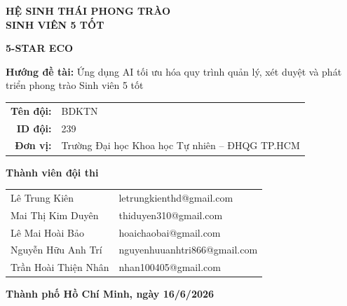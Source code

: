 \begin{titlepage}
\begin{center}
\end{center}

\begin{center}
    \vspace{5pt}
    \fontsize{24pt}{28pt}\selectfont
    \textbf{HỆ SINH THÁI PHONG TRÀO \\ SINH VIÊN 5 TỐT}

    \vspace{8pt}
    \fontsize{20pt}{24pt}\selectfont
    \textbf{5-STAR ECO}
\end{center}


\begin{center}
    \fontsize{16pt}{15pt}\selectfont
    \textbf{Hướng đề tài:} Ứng dụng AI tối ưu hóa quy trình quản lý, xét duyệt và phát triển phong trào Sinh viên 5 tốt
\end{center}

\vspace{0.8cm}

\fontsize{13pt}{12pt}\selectfont
\begin{center}
\begin{tabular}{rl}
    \textbf{Tên đội:} & BDKTN \\
    \textbf{ID đội:} & 239 \\
    \textbf{Đơn vị:} & Trường Đại học Khoa học Tự nhiên -- ĐHQG TP.HCM \\
\end{tabular}
\end{center}

\vspace{1cm}

\fontsize{13pt}{12pt}\selectfont
\begin{center}
    \large \textbf{Thành viên đội thi}
\end{center}

\fontsize{13pt}{12pt}\selectfont
\begin{center}
\begin{tabular}{ll}
    Lê Trung Kiên & letrungkienthd@gmail.com \\
    Mai Thị Kim Duyên & thiduyen310@gmail.com \\
    Lê Mai Hoài Bảo & hoaichaobai@gmail.com \\
    Nguyễn Hữu Anh Trí & nguyenhuuanhtri866@gmail.com \\
    Trần Hoài Thiện Nhân & nhan100405@gmail.com \\
\end{tabular}
\end{center}

\vfill

\begin{center}
    \textbf{Thành phố Hồ Chí Minh, ngày 16/6/2026}
\end{center}

\end{titlepage}